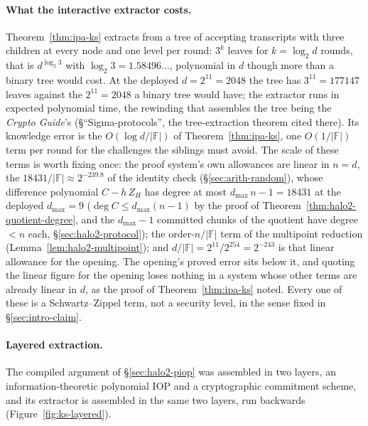 \documentclass[11pt,a4paper]{article}
\theoremstyle{definition}
\newcommand{\F}{\mathbb{F}}
\newcommand{\ZH}{Z_H}
\begin{document}
\paragraph{What the interactive extractor costs.}
Theorem~\ref{thm:ipa-ks} extracts from a tree of accepting transcripts
with three children at every node and one level per round: $3^{k}$
leaves for $k = \log_2 d$ rounds, that is $d^{\log_2 3}$ with
$\log_2 3 = 1.58496\ldots$, polynomial in $d$ though more than a binary
tree would cost. At the deployed $d = 2^{11} = 2048$ the tree has
$3^{11} = 177147$ leaves against the $2^{11} = 2048$ a binary tree
would have; the extractor runs in expected polynomial time, the
rewinding that assembles the tree being the \emph{Crypto Guide}'s
(\S``Sigma-protocols'', the tree-extraction theorem cited there). Its
knowledge error is the $O(\log d/|\F|)$ of Theorem~\ref{thm:ipa-ks}, one
$O(1/|\F|)$ term per round for the challenges the siblings must avoid.
The scale of these terms is worth fixing once:
the proof system's own allowances are linear in $n = d$, the
$18431/|\F| \approx 2^{-239.8}$ of the identity check
(\S\ref{sec:arith-random}), whose difference polynomial $C - h\,\ZH$ has
degree at most $d_{\max}\,n - 1 = 18431$ at the deployed $d_{\max} = 9$
($\deg C \le d_{\max}(n - 1)$ by the proof of
Theorem~\ref{thm:halo2-quotient-degree}, and the $d_{\max} - 1$ committed
chunks of the quotient have degree $< n$ each, \S\ref{sec:halo2-protocol});
the order-$n/|\F|$ term of
the multipoint reduction (Lemma~\ref{lem:halo2-multipoint}); and
$d/|\F| = 2^{11}/2^{254} = 2^{-243}$ is that linear allowance for the
opening. The opening's proved error sits below it, and quoting the
linear figure for the opening loses nothing in a system whose other
terms are already linear in $d$, as the proof of
Theorem~\ref{thm:ipa-ks} noted. Every one of these is a Schwartz--Zippel
term, not a security level, in the sense fixed in \S\ref{sec:intro-claim}.

\paragraph{Layered extraction.}
The compiled argument of \S\ref{sec:halo2-piop} was assembled in two
layers, an information-theoretic polynomial IOP and a cryptographic
commitment scheme, and its extractor is assembled in the same two
layers, run backwards (Figure~\ref{fig:ks-layered}).
\end{document}
